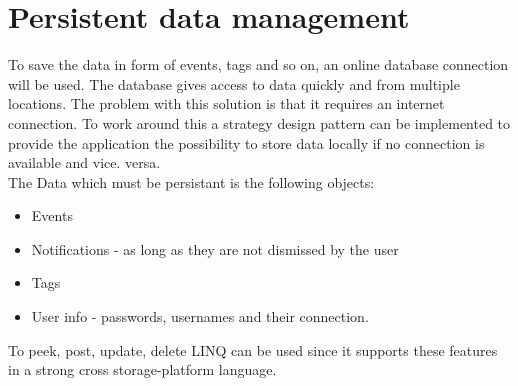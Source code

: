 \section{Persistent data management}
To save the data in form of events, tags and so on, an online database connection will be used. The database gives access to data quickly and from multiple locations. The problem with this solution is that it requires an internet connection. To work around this a strategy design pattern can be implemented to provide the application the possibility to store data locally if no connection is available and vice. versa. \\
The Data which must be persistant is the following objects:
\begin{itemize}
	\item Events
	\item Notifications - as long as they are not dismissed by the user
	\item Tags 
	\item User info - passwords, usernames and their connection.
\end{itemize}
To peek, post, update, delete LINQ can be used since it supports these features in a strong cross storage-platform language.